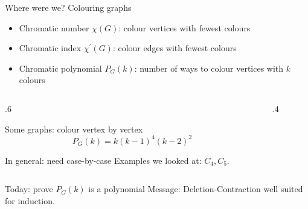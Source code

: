 \documentclass{beamer}
\begin{document}
\begin{frame}{Where were we? Colouring graphs}
\begin{itemize}
    \item Chromatic number $\chi(G)$: colour vertices with fewest colours
    \item Chromatic index $\chi^\prime(G)$: colour edges with fewest colours
    \item Chromatic polynomial $P_G(k)$: number of ways to colour vertices with $k$ colours
\end{itemize}


\begin{columns}
   \begin{column}{.6\textwidth}
 \begin{block}{Some graphs: colour vertex by vertex}
$$P_G(k)=k(k-1)^4(k-2)^2$$
\end{block}
\begin{block}{In general: need case-by-case}
Examples we looked at: $C_4, C_5$.
\end{block}
\end{column}
        
      \begin{column}{.4\textwidth}
        \end{column}  
    \end{columns}
\begin{block}{Today: prove $P_G(k)$ is a polynomial}
Message: Deletion-Contraction well suited for induction.
\end{block}
  \end{frame}
\end{document}
